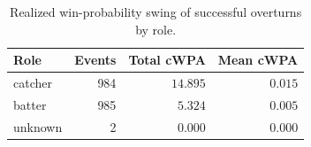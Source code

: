 \begin{table}[h]
\centering
\caption{Realized win-probability swing of successful overturns by role.}
\label{tab:cwpa}
\small
\begin{tabular}{lrrr}
\toprule
Role & Events & Total cWPA & Mean cWPA \\
\midrule
catcher & 984 & $14.895$ & $0.015$ \\
batter & 985 & $5.324$ & $0.005$ \\
unknown & 2 & $0.000$ & $0.000$ \\
\bottomrule
\end{tabular}
\end{table}
